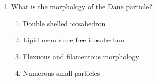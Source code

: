\documentclass[12pt]{article}
\begin{document}
\begin{enumerate}[label=\arabic*.]
\begin{enumerate}[label=(\alph*)]
    \item an association.
    \item a dysplasia.
    \item a sequence.
    \item a syndrome.
\end{enumerate}
\item What is the morphology of the Dane particle?
\begin{enumerate}[label=(\alph*)]
    \item Double shelled icosahedron
    \item Lipid membrane free icosahedron
    \item Flexuous and filamentous morphology
    \item Numerous small particles
\end{enumerate}
\end{enumerate}
\end{document}
